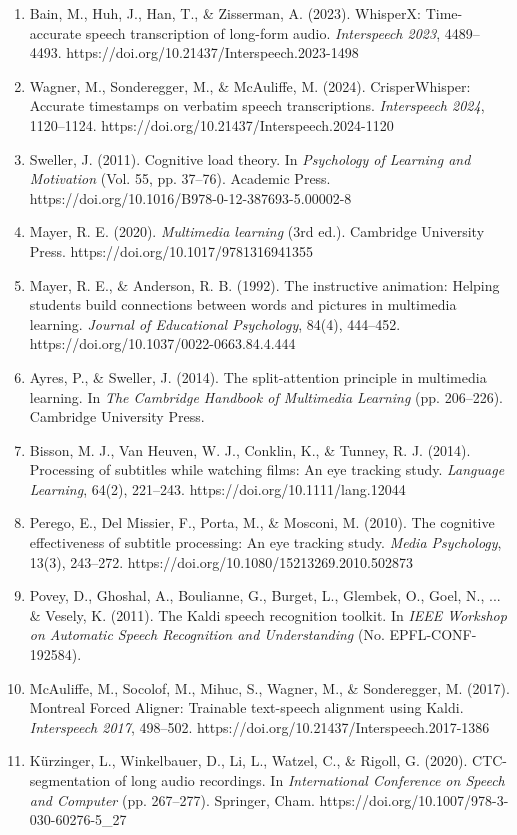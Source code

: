 \documentclass[12pt,a4paper]{article}
\begin{document}
\begin{enumerate}
    \item Bain, M., Huh, J., Han, T., \& Zisserman, A. (2023). WhisperX: Time-accurate speech transcription of long-form audio. \textit{Interspeech 2023}, 4489--4493. https://doi.org/10.21437/Interspeech.2023-1498
    \item Wagner, M., Sonderegger, M., \& McAuliffe, M. (2024). CrisperWhisper: Accurate timestamps on verbatim speech transcriptions. \textit{Interspeech 2024}, 1120--1124. https://doi.org/10.21437/Interspeech.2024-1120
    \item Sweller, J. (2011). Cognitive load theory. In \textit{Psychology of Learning and Motivation} (Vol. 55, pp. 37--76). Academic Press. https://doi.org/10.1016/B978-0-12-387693-5.00002-8
    \item Mayer, R. E. (2020). \textit{Multimedia learning} (3rd ed.). Cambridge University Press. https://doi.org/10.1017/9781316941355
    \item Mayer, R. E., \& Anderson, R. B. (1992). The instructive animation: Helping students build connections between words and pictures in multimedia learning. \textit{Journal of Educational Psychology}, 84(4), 444--452. https://doi.org/10.1037/0022-0663.84.4.444
    \item Ayres, P., \& Sweller, J. (2014). The split-attention principle in multimedia learning. In \textit{The Cambridge Handbook of Multimedia Learning} (pp. 206--226). Cambridge University Press.
    \item Bisson, M. J., Van Heuven, W. J., Conklin, K., \& Tunney, R. J. (2014). Processing of subtitles while watching films: An eye tracking study. \textit{Language Learning}, 64(2), 221--243. https://doi.org/10.1111/lang.12044
    \item Perego, E., Del Missier, F., Porta, M., \& Mosconi, M. (2010). The cognitive effectiveness of subtitle processing: An eye tracking study. \textit{Media Psychology}, 13(3), 243--272. https://doi.org/10.1080/15213269.2010.502873
    \item Povey, D., Ghoshal, A., Boulianne, G., Burget, L., Glembek, O., Goel, N., ... \& Vesely, K. (2011). The Kaldi speech recognition toolkit. In \textit{IEEE Workshop on Automatic Speech Recognition and Understanding} (No. EPFL-CONF-192584).
    \item McAuliffe, M., Socolof, M., Mihuc, S., Wagner, M., \& Sonderegger, M. (2017). Montreal Forced Aligner: Trainable text-speech alignment using Kaldi. \textit{Interspeech 2017}, 498--502. https://doi.org/10.21437/Interspeech.2017-1386
    \item K\"urzinger, L., Winkelbauer, D., Li, L., Watzel, C., \& Rigoll, G. (2020). CTC-segmentation of long audio recordings. In \textit{International Conference on Speech and Computer} (pp. 267--277). Springer, Cham. https://doi.org/10.1007/978-3-030-60276-5_27

\end{enumerate}
\end{document}
